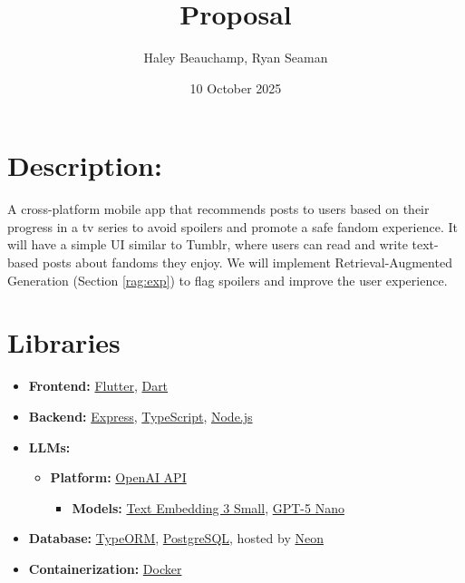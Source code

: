 \documentclass{homework}
\author{Haley Beauchamp, Ryan Seaman}
\date{10 October 2025}
\title{Proposal}
\begin{document}
 \maketitle

\section{Description:}

A cross-platform mobile app that recommends posts to users based on
their progress in a tv series to avoid spoilers and promote a safe
fandom experience. It will have a simple UI similar to Tumblr, where
users can read and write text-based posts about fandoms they enjoy. We
will implement Retrieval-Augmented Generation (Section \ref{rag:exp})
to flag spoilers and improve the user experience.

\section{Libraries}
\begin{itemize}
  \item \textbf{Frontend:} 
  \href{https://flutter.dev/}{Flutter}, 
  \href{https://dart.dev/}{Dart}

  \item \textbf{Backend:} 
  \href{https://expressjs.com/}{Express}, 
  \href{https://www.typescriptlang.org/}{TypeScript}, 
  \href{https://nodejs.org/en}{Node.js}

  \item \textbf{LLMs:}
  \begin{itemize}
    \item \textbf{Platform:} 
    \href{https://openai.com/api/}{OpenAI API}
    \begin{itemize}
      \item \textbf{Models:} 
      \href{https://platform.openai.com/docs/models/text-embedding-3-small}{Text Embedding 3 Small}, 
      \href{https://platform.openai.com/docs/models/gpt-5-nano}{GPT-5 Nano}
    \end{itemize}
  \end{itemize}

  \item \textbf{Database:} 
  \href{https://typeorm.io/}{TypeORM}, 
  \href{https://www.postgresql.org/}{PostgreSQL}, 
  hosted by \href{https://neon.tech/}{Neon}

  \item \textbf{Containerization:} 
  \href{https://www.docker.com/}{Docker}
\end{itemize}
\end{document}
